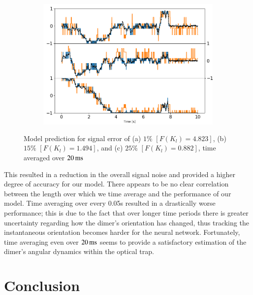 \documentclass[final,  3p]{elsarticle}
\begin{document}
\begin{figure}[h]
\begin{subfigure}{0.32\textwidth}
		\includegraphics[width=\textwidth]{./Images/fig11c.png}
	\end{subfigure}
	\caption{Model prediction for signal error of (a) $1\%$ $[F(K_l)=4.823]$,  (b) $15\%$ $[F(K_l)=1.494]$, and (c) $25\%$ $[F(K_l)=0.882]$, time averaged over $20\,{\rm ms}$}
	\label{fig:time average}
\end{figure}
This resulted in a reduction in the overall signal noise and provided a higher degree of accuracy for our model. There appears to be no clear correlation between the length over which we time average and the performance of our model. Time averaging over every 0.05s resulted in a drastically worse performance; this is due to the fact that over longer time periods there is greater uncertainty regarding how the dimer's orientation has changed, thus tracking the instantaneous orientation becomes harder for the neural network. Fortunately, time averaging even over $20\,{\rm ms}$ seems to provide a satisfactory estimation of the dimer's angular dynamics within the optical trap. 

\section{Conclusion}
\label{sec:Conclusion}
\end{document}

